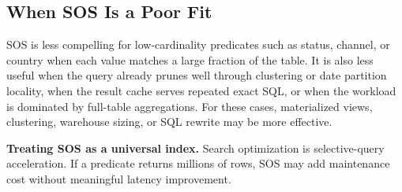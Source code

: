 \subsection{When SOS Is a Poor Fit}
SOS is less compelling for low-cardinality predicates such as status, channel, or country when each value matches a large fraction of the table. It is also less useful when the query already prunes well through clustering or date partition locality, when the result cache serves repeated exact SQL, or when the workload is dominated by full-table aggregations. For these cases, materialized views, clustering, warehouse sizing, or SQL rewrite may be more effective.
\begin{pitfall}
\textbf{Treating SOS as a universal index.} Search optimization is selective-query acceleration. If a predicate returns millions of rows, SOS may add maintenance cost without meaningful latency improvement.
\end{pitfall}

